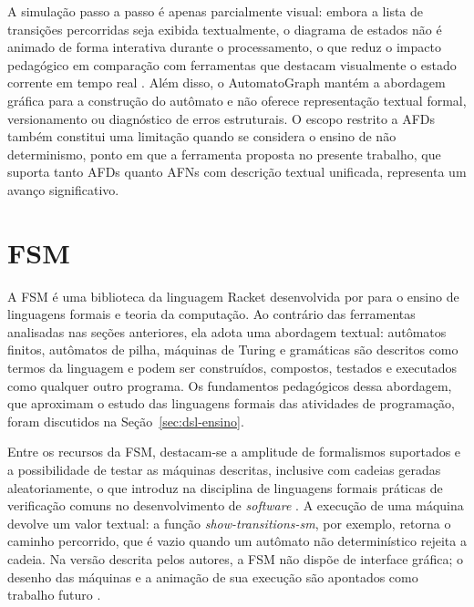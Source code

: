 \documentclass[
    12pt
    ,oneside
    ,a4paper
    ,chapter=TITLE
    ,section=TITLE
    ,sumario=abnt-6027-2012]{abntex2}
\begin{document}
A simulação passo a passo é apenas parcialmente visual: embora a lista de transições percorridas
seja exibida textualmente, o diagrama de estados não é animado de forma interativa durante o
processamento, o que reduz o impacto pedagógico em comparação com ferramentas que destacam
visualmente o estado corrente em tempo real \cite{kienetz2016automatograph}. Além disso, o
AutomatoGraph mantém a abordagem gráfica para a construção do autômato e não oferece
representação textual formal, versionamento ou diagnóstico de erros estruturais. O escopo
restrito a AFDs também constitui uma limitação quando se considera o ensino de
não determinismo, ponto em que a ferramenta proposta no presente trabalho, que suporta tanto
AFDs quanto AFNs com descrição textual unificada, representa um avanço significativo.

\section{FSM}
\label{sec:rel-fsm}

A FSM é uma biblioteca da linguagem Racket desenvolvida por  para o
ensino de linguagens formais e teoria da computação. Ao contrário das ferramentas analisadas
nas seções anteriores, ela adota uma abordagem textual: autômatos finitos, autômatos de pilha,
máquinas de Turing e gramáticas são descritos como termos da linguagem e podem ser
construídos, compostos, testados e executados como qualquer outro programa. Os fundamentos
pedagógicos dessa abordagem, que aproximam o estudo das linguagens formais das atividades de
programação, foram discutidos na Seção~\ref{sec:dsl-ensino}.

Entre os recursos da FSM, destacam-se a amplitude de formalismos suportados e a possibilidade
de testar as máquinas descritas, inclusive com cadeias geradas aleatoriamente, o que introduz
na disciplina de linguagens formais práticas de verificação comuns no desenvolvimento de
\textit{software} \cite{morazan2014}. A execução de uma máquina devolve um valor textual: a
função \textit{show-transitions-sm}, por exemplo, retorna o caminho percorrido, que é vazio
quando um autômato não determinístico rejeita a cadeia. Na versão descrita pelos autores, a
FSM não dispõe de interface gráfica; o desenho das máquinas e a animação de sua execução são
apontados como trabalho futuro \cite{morazan2014}.
\end{document}
